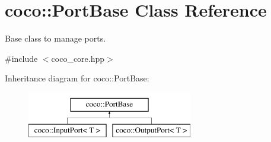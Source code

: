 \hypertarget{classcoco_1_1_port_base}{}\section{coco\+:\+:Port\+Base Class Reference}
\label{classcoco_1_1_port_base}


Base class to manage ports.  




{\ttfamily \#include $<$coco\+\_\+core.\+hpp$>$}

Inheritance diagram for coco\+:\+:Port\+Base\+:\begin{figure}[H]
\begin{center}
\leavevmode
\includegraphics[height=2.000000cm]{classcoco_1_1_port_base}
\end{center}
\end{figure}
